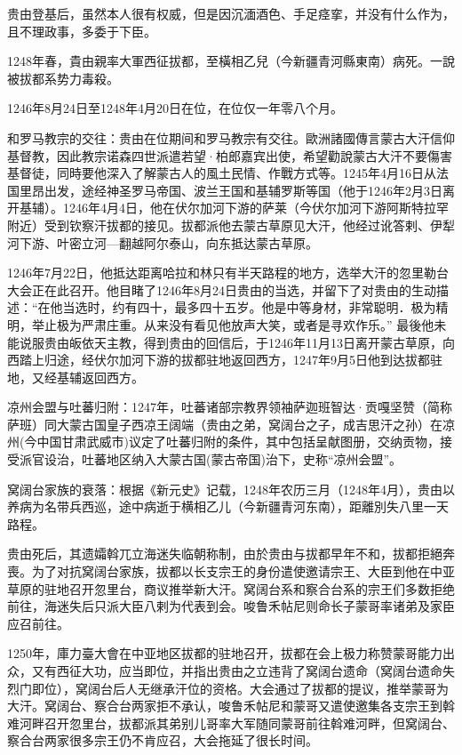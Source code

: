 贵由登基后，虽然本人很有权威，但是因沉湎酒色、手足痉挛，并没有什么作为，且不理政事，多委于下臣。

1248年春，貴由親率大軍西征拔都，至橫相乙兒（今新疆青河縣東南）病死。一說被拔都系势力毒殺。

1246年8月24日至1248年4月20日在位，在位仅一年零八个月。

和罗马教宗的交往：贵由在位期间和罗马教宗有交往。歐洲諸國傳言蒙古大汗信仰基督教，因此教宗诺森四世派遣若望·柏郎嘉宾出使，希望勸說蒙古大汗不要傷害基督徒，同時要他深入了解蒙古人的風土民情、作戰方式等。1245年4月16日从法国里昂出发，途经神圣罗马帝国、波兰王国和基辅罗斯等国（他于1246年2月3日离开基辅）。1246年4月4日，他在伏尔加河下游的萨莱（今伏尔加河下游阿斯特拉罕附近）受到钦察汗拔都的接见。拔都派他去蒙古草原见大汗，他经过讹答剌、伊犁河下游、叶密立河—翻越阿尔泰山，向东抵达蒙古草原。

1246年7月22日，他抵达距离哈拉和林只有半天路程的地方，选举大汗的忽里勒台大会正在此召开。他目睹了1246年8月24日贵由的当选，并留下了对贵由的生动描述：“在他当选时，约有四十，最多四十五岁。他是中等身材，非常聪明．极为精明，举止极为严肃庄重。从来没有看见他放声大笑，或者是寻欢作乐。” 最後他未能说服贵由皈依天主教，得到贵由的回信后，于1246年11月13日离开蒙古草原，向西踏上归途，经伏尔加河下游的拔都驻地返回西方，1247年9月5日他到达拔都驻地，又经基辅返回西方。

凉州会盟与吐蕃归附：1247年，吐蕃诸部宗教界领袖萨迦班智达·贡嘎坚赞（简称萨班）同大蒙古国皇子西凉王阔端（贵由之弟，窝阔台之子，成吉思汗之孙）在凉州(今中国甘肃武威市)议定了吐蕃归附的条件，其中包括呈献图册，交纳贡物，接受派官设治，吐蕃地区纳入大蒙古国(蒙古帝国)治下，史称“凉州会盟”。

窝阔台家族的衰落：根据《新元史》记载，1248年农历三月（1248年4月），贵由以养病为名带兵西巡，途中病逝于横相乙儿（今新疆青河东南），距離別失八里一天路程。

贵由死后，其遗孀斡兀立海迷失临朝称制，由於贵由与拔都早年不和，拔都拒絕奔喪。为了对抗窝阔台家族，拔都以长支宗王的身份遣使邀请宗王、大臣到他在中亚草原的驻地召开忽里台，商议推举新大汗。窝阔台系和察合台系的宗王们多数拒绝前往，海迷失后只派大臣八剌为代表到会。唆鲁禾帖尼则命长子蒙哥率诸弟及家臣应召前往。

1250年，庫力臺大會在中亚地区拔都的驻地召开，拔都在会上极力称赞蒙哥能力出众，又有西征大功，应当即位，并指出贵由之立违背了窝阔台遗命（窝阔台遗命失烈门即位），窝阔台后人无继承汗位的资格。大会通过了拔都的提议，推举蒙哥为大汗。窝阔台、察合台两家拒不承认，唆鲁禾帖尼和蒙哥又遣使邀集各支宗王到斡难河畔召开忽里台，拔都派其弟别儿哥率大军随同蒙哥前往斡难河畔，但窝阔台、察合台两家很多宗王仍不肯应召，大会拖延了很长时间。

